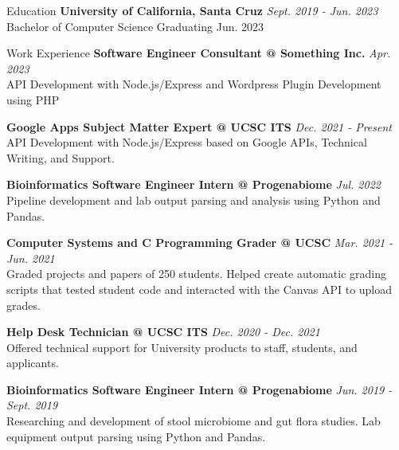 \documentclass{resume} %
\begin{document}
\begin{rSection}{Education}
    {\bf{University of California, Santa Cruz}}
    \hfill{\em Sept. 2019 - Jun. 2023}
    \\ Bachelor of Computer Science \hfill{ Graduating Jun. 2023 }
\end{rSection}

\begin{rSection}{Work Experience}
    {\bf{Software Engineer Consultant} @  Something Inc.}
    \hfill{\em Apr. 2023}
    \\ API Development with Node.js/Express and Wordpress Plugin Development using PHP

    {\bf{Google Apps Subject Matter Expert} @ UCSC ITS }
    \hfill{\em Dec. 2021 - Present}
    \\ API Development with Node.js/Express based on Google APIs, Technical Writing, and Support.

    {\bf{Bioinformatics Software Engineer Intern} @ Progenabiome}
    \hfill{\em Jul. 2022}
    \\Pipeline development and lab output parsing and analysis using Python and Pandas.


    {\bf{Computer Systems and C Programming Grader} @ UCSC}
    \hfill{\em Mar. 2021 - Jun. 2021}
    \\ Graded projects and papers of 250 students. Helped create automatic grading scripts that tested student code and interacted with the Canvas API to upload grades.

    {\bf{Help Desk Technician} @ UCSC ITS}
    \hfill{\em Dec. 2020 - Dec. 2021}
    \\ Offered technical support for University products to staff, students, and applicants.

    {\bf{Bioinformatics Software Engineer Intern} @ Progenabiome}
    \hfill{\em Jun. 2019 - Sept. 2019}
    \\ Researching and development of stool microbiome and gut flora studies. Lab equipment output parsing using Python and Pandas.
\end{rSection}
\end{document}
